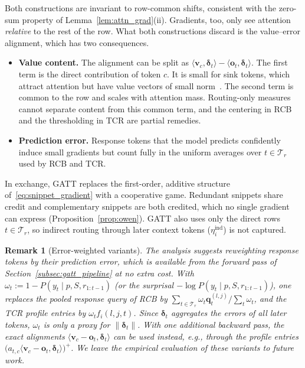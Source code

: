 \documentclass{article}
\newtheorem{remark}[theorem]{Remark}
\begin{document}
Both constructions are invariant to row-common shifts, consistent with the zero-sum property of Lemma~\ref{lem:attn_grad}(ii). Gradients, too, only see attention \emph{relative} to the rest of the row. What both constructions discard is the value--error alignment, which has two consequences.
\begin{itemize}
    \item \textbf{Value content.} The alignment can be split as $\langle \mathbf{v}_c, \boldsymbol{\delta}_t \rangle - \langle \mathbf{o}_t, \boldsymbol{\delta}_t \rangle$. The first term is the direct contribution of token $c$. It is small for sink tokens, which attract attention but have value vectors of small norm~\cite{kobayashi2020attention, xiao2024efficient}. The second term is common to the row and scales with attention mass. Routing-only measures cannot separate content from this common term, and the centering in RCB and the thresholding in TCR are partial remedies.
    \item \textbf{Prediction error.} Response tokens that the model predicts confidently induce small gradients but count fully in the uniform averages over $t \in \mathcal{T}_r$ used by RCB and TCR.
\end{itemize}
In exchange, GATT replaces the first-order, additive structure of~\eqref{eq:snippet_gradient} with a cooperative game. Redundant snippets share credit and complementary snippets are both credited, which no single gradient can express (Proposition~\ref{prop:owen}). GATT also uses only the direct rows $t \in \mathcal{T}_r$, so indirect routing through later context tokens ($\eta_i^{\text{ind}}$) is not captured.

\begin{remark}[Error-weighted variants]\label{rem:error_weighted}
The analysis suggests reweighting response tokens by their prediction error, which is available from the forward pass of Section~\ref{subsec:gatt_pipeline} at no extra cost. With $\omega_t := 1 - P(y_t \mid p, S, r_{1:t-1})$ (or the surprisal $-\log P(y_t \mid p, S, r_{1:t-1})$), one replaces the pooled response query of RCB by $\sum_{t \in \mathcal{T}_r} \omega_t \mathbf{q}_t^{(l,j)} / \sum_t \omega_t$, and the TCR profile entries by $\omega_t f_i(l,j,t)$. Since $\boldsymbol{\delta}_t$ aggregates the errors of all later tokens, $\omega_t$ is only a proxy for $\|\boldsymbol{\delta}_t\|$. With one additional backward pass, the exact alignments $\langle \mathbf{v}_c - \mathbf{o}_t, \boldsymbol{\delta}_t \rangle$ can be used instead, e.g., through the profile entries $\big( a_{t,c} \langle \mathbf{v}_c - \mathbf{o}_t, \boldsymbol{\delta}_t \rangle \big)^+$. We leave the empirical evaluation of these variants to future work.
\end{remark}
\end{document}
